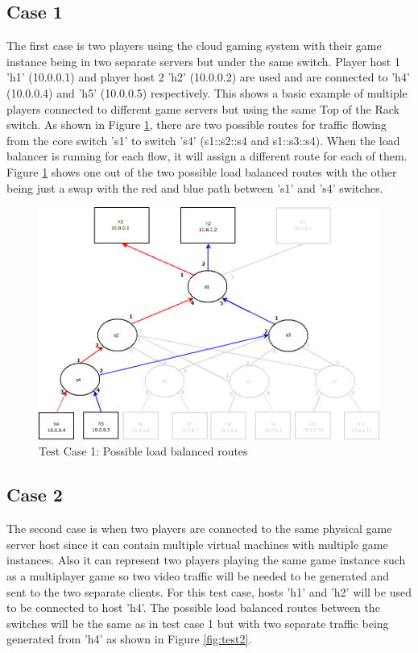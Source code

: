 \subsection{Case 1}
The first case is two players using the cloud gaming system with their game instance being in two separate servers but under the same switch. Player host 1 'h1' (10.0.0.1) and player host 2 'h2' (10.0.0.2) are used and are connected to 'h4' (10.0.0.4) and 'h5' (10.0.0.5) respectively. This shows a basic example of multiple players connected to different game servers but using the same Top of the Rack switch. As shown in Figure \ref{fig:test1}, there are two possible routes for traffic flowing from the core switch 's1' to switch 's4' (s1::s2::s4 and s1::s3::s4). When the load balancer is running for each flow, it will assign a different route for each of them. Figure \ref{fig:test1} shows one out of the two possible load balanced routes with the other being just a swap with the red and blue path between 's1' and 's4' switches.

\begin{figure}[h!]
 \includegraphics[width=\linewidth]{images/test1.png}
 \caption{Test Case 1: Possible load balanced routes}
 \label{fig:test1}
\end{figure}

\subsection{Case 2}
The second case is when two players are connected to the same physical game server host since it can contain multiple virtual machines with multiple game instances. Also it can represent two players playing the same game instance such as a multiplayer game so two video traffic will be needed to be generated and sent to the two separate clients. For this test case, hosts 'h1' and 'h2' will be used to be connected to host 'h4'. The possible load balanced routes between the switches will be the same as in test case 1 but with two separate traffic being generated from 'h4' as shown in Figure \ref{fig:test2}.

